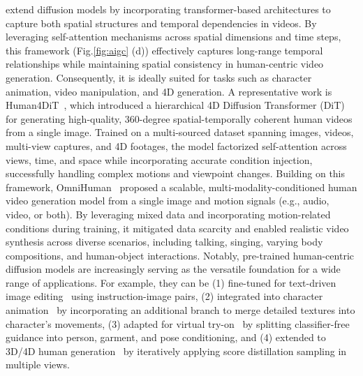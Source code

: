 

 extend diffusion models by incorporating transformer-based architectures to capture both spatial structures and temporal dependencies in videos. By leveraging self-attention mechanisms across spatial dimensions and time steps, this framework (Fig.\ref{fig:aigc} (d)) effectively captures long-range temporal relationships while maintaining spatial consistency in human-centric video generation. Consequently, it is ideally suited for tasks such as character animation, video manipulation, and 4D generation. A representative work is Human4DiT~\cite{shao2024360}, which introduced a hierarchical 4D Diffusion Transformer (DiT) for generating high-quality, 360-degree spatial-temporally coherent human videos from a single image. Trained on a multi-sourced dataset spanning images, videos, multi-view captures, and 4D footages, the model factorized self-attention across views, time, and space while incorporating accurate condition injection, successfully handling complex motions and viewpoint changes.
Building on this framework, OmniHuman~\cite{lin2025omnihuman1} proposed a scalable, multi-modality-conditioned human video generation model from a single image and motion signals (e.g., audio, video, or both).
By leveraging mixed data and incorporating motion-related conditions during training, it mitigated data scarcity and enabled realistic video synthesis across diverse scenarios, including talking, singing, varying body compositions, and human-object interactions. Notably, pre-trained human-centric diffusion models are increasingly serving as the versatile foundation for a wide range of applications.
For example, they can be 
(1) fine-tuned for text-driven image editing~\cite{brooks2023instructpix2pix} using instruction-image pairs, 
(2) integrated into character animation~\cite{hu2024animate} by incorporating an additional branch to merge detailed textures into character's movements, 
(3) adapted for virtual try-on~\cite{karras2024fashion} by splitting classifier-free guidance into person, garment, and pose conditioning, and 
(4) extended to 3D/4D human generation~\cite{kolotouros2023dreamhuman} by iteratively applying score distillation sampling in multiple views.